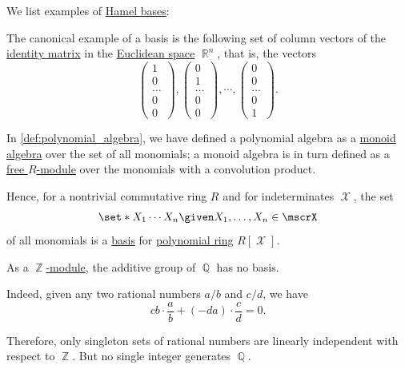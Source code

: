 \begin{example}\label{ex:def:hamel_basis}
  We list examples of \hyperref[def:hamel_basis]{Hamel bases}:
  \begin{thmenum}
     The canonical example of a basis is the following set of column vectors of the \hyperref[eq:thm:matrix_algebra/matrix_multiplication/identity]{identity matrix} in the \hyperref[def:euclidean_space]{Euclidean space} \( \BbbR^n \), that is, the vectors
    \begin{equation*}
      \begin{pmatrix}
        1 \\ 0 \\ \ldots \\ 0 \\ 0
      \end{pmatrix},
      \begin{pmatrix}
        0 \\ 1 \\ \ldots \\ 0 \\ 0
      \end{pmatrix},
      \cdots,
      \begin{pmatrix}
        0 \\ 0 \\ \ldots \\ 0 \\ 1
      \end{pmatrix}.
    \end{equation*}

     In \cref{def:polynomial_algebra}, we have defined a polynomial algebra as a \hyperref[def:semigroup_algebra]{monoid algebra} over the set of all monomials; a monoid algebra is in turn defined as a \hyperref[def:free_semimodule]{free \( R \)-module} over the monomials with a convolution product.

    Hence, for a nontrivial commutative ring \( R \) and for indeterminates \( \mscrX \), the set
    \begin{equation*}
      \set*{ X_1 \cdots X_n \given X_1, \ldots, X_n \in \mscrX }
    \end{equation*}
    of all monomials is a \hyperref[def:hamel_basis]{basis} for \hyperref[def:polynomial_algebra]{polynomial ring} \( R[\mscrX] \).

     As a \hyperref[thm:abelian_group_is_module]{\( \BbbZ \)-module}, the additive group of \( \BbbQ \) has no basis.

    Indeed, given any two rational numbers \( a / b \) and \( c / d \), we have
    \begin{equation*}
      cb \cdot \frac a b + (-da) \cdot \frac c d = 0.
    \end{equation*}

    Therefore, only singleton sets of rational numbers are linearly independent with respect to \( \BbbZ \). But no single integer generates \( \BbbQ \).
  \end{thmenum}
\end{example}

